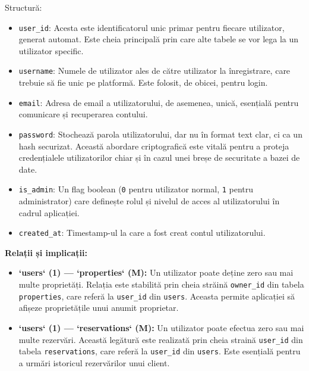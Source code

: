 \documentclass[12pt, a4paper, oneside, romanian]{teza-upb}
\begin{document}
	Structură:
	\begin{itemize}
		\item \texttt{user\_id}: Acesta este identificatorul unic primar pentru fiecare utilizator, generat automat. Este cheia principală prin care alte tabele se vor lega la un utilizator specific.
		\item \texttt{username}: Numele de utilizator ales de către utilizator la înregistrare, care trebuie să fie unic pe platformă. Este folosit, de obicei, pentru login.
		\item \texttt{email}: Adresa de email a utilizatorului, de asemenea, unică, esențială pentru comunicare și recuperarea contului.
		\item \texttt{password}: Stochează parola utilizatorului, dar nu în format text clar, ci ca un hash securizat. Această abordare criptografică este vitală pentru a proteja credențialele utilizatorilor chiar și în cazul unei breșe de securitate a bazei de date.
		\item \texttt{is\_admin}: Un flag boolean (\texttt{0} pentru utilizator normal, \texttt{1} pentru administrator) care definește rolul și nivelul de acces al utilizatorului în cadrul aplicației.
		\item \texttt{created\_at}: Timestamp-ul la care a fost creat contul utilizatorului.
	\end{itemize}
	 \textbf{Relații și implicații:}
	\begin{itemize}
		\item \textbf{`users` (1) --- `properties` (M):} Un utilizator poate deține zero sau mai multe proprietăți. Relația este stabilită prin cheia străină \texttt{owner\_id} din tabela \texttt{properties}, care referă la \texttt{user\_id} din \texttt{users}. Aceasta permite aplicației să afișeze proprietățile unui anumit proprietar.
		\item \textbf{`users` (1) --- `reservations` (M):} Un utilizator poate efectua zero sau mai multe rezervări. Această legătură este realizată prin cheia straină \texttt{user\_id} din tabela \texttt{reservations}, care referă la \texttt{user\_id} din \texttt{users}. Este esențială pentru a urmări istoricul rezervărilor unui client.
	\end{itemize}
\end{document}
